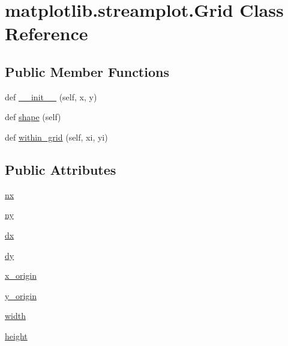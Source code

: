 \hypertarget{classmatplotlib_1_1streamplot_1_1Grid}{}\section{matplotlib.\+streamplot.\+Grid Class Reference}
\label{classmatplotlib_1_1streamplot_1_1Grid}
\subsection*{Public Member Functions}
\begin{DoxyCompactItemize}
\item 
def \hyperlink{classmatplotlib_1_1streamplot_1_1Grid_af87d62d6711cb33c2e4c2bbcac766772}{\+\_\+\+\_\+init\+\_\+\+\_\+} (self, x, y)
\item 
def \hyperlink{classmatplotlib_1_1streamplot_1_1Grid_a1e92c0bb0780ffbaa250eda16f42e2c0}{shape} (self)
\item 
def \hyperlink{classmatplotlib_1_1streamplot_1_1Grid_a9a53760f109670f8078b302a33fb751d}{within\+\_\+grid} (self, xi, yi)
\end{DoxyCompactItemize}
\subsection*{Public Attributes}
\begin{DoxyCompactItemize}
\item 
\hyperlink{classmatplotlib_1_1streamplot_1_1Grid_a1407fb21a5673087b69371aa96c3a150}{nx}
\item 
\hyperlink{classmatplotlib_1_1streamplot_1_1Grid_a44cd4b8173659a15f450bd9c9fe48137}{ny}
\item 
\hyperlink{classmatplotlib_1_1streamplot_1_1Grid_a17f3d3262ca4b19a509a8913547a6aad}{dx}
\item 
\hyperlink{classmatplotlib_1_1streamplot_1_1Grid_a9b859c9f5a05cd0e901173e2b8959898}{dy}
\item 
\hyperlink{classmatplotlib_1_1streamplot_1_1Grid_a5cb30db4130e183075c260d02444189f}{x\+\_\+origin}
\item 
\hyperlink{classmatplotlib_1_1streamplot_1_1Grid_abe050c4a518529bc7cdbde37629b5c06}{y\+\_\+origin}
\item 
\hyperlink{classmatplotlib_1_1streamplot_1_1Grid_a881eea1148262303ea361e13c232c3a5}{width}
\item 
\hyperlink{classmatplotlib_1_1streamplot_1_1Grid_ae59370fd7bfaf6bab9f5a9b2e375f023}{height}
\end{DoxyCompactItemize}


